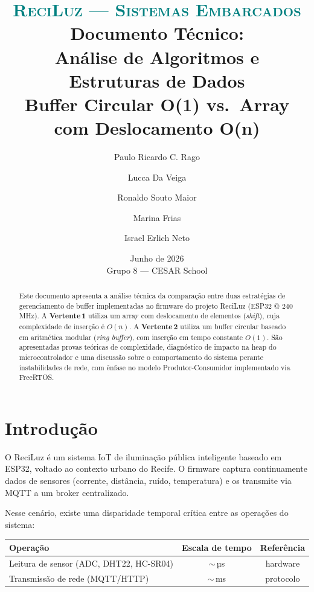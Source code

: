 \documentclass[12pt, a4paper]{article}
\title{
  \vspace{-1cm}
  {\large \textcolor{teal}{\textsc{ReciLuz — Sistemas Embarcados}}}\\[0.4em]
  {\LARGE \textbf{Documento Técnico:\\Análise de Algoritmos e\\Estruturas de Dados}}\\[0.4em]
  {\normalsize Buffer Circular \textcolor{verde}{O(1)} vs.\ Array com Deslocamento \textcolor{vermelho}{O(n)}}
}
\author{
  Paulo Ricardo C. Rago \and
  Lucca Da Veiga \and
  Ronaldo Souto Maior \and
  Marina Frias \and
  Israel Erlich Neto
}
\date{Junho de 2026\\[0.4em]\small Grupo 8 — CESAR School}
\theoremstyle{definition}
\theoremstyle{remark}
\begin{document}

\maketitle
\thispagestyle{fancy}

\begin{abstract}
Este documento apresenta a análise técnica da comparação entre duas estratégias
de gerenciamento de buffer implementadas no firmware do projeto ReciLuz
(ESP32 @ 240\,MHz).
A \textbf{Vertente\,1} utiliza um array com deslocamento de elementos
(\emph{shift}), cuja complexidade de inserção é $O(n)$.
A \textbf{Vertente\,2} utiliza um buffer circular baseado em aritmética modular
(\emph{ring buffer}), com inserção em tempo constante $O(1)$.
São apresentadas provas teóricas de complexidade, diagnóstico de impacto na
heap do microcontrolador e uma discussão sobre o comportamento do sistema
perante instabilidades de rede, com ênfase no modelo Produtor-Consumidor
implementado via FreeRTOS.
\end{abstract}

\tableofcontents
\newpage

\section{Introdução}

O ReciLuz é um sistema IoT de iluminação pública inteligente baseado em ESP32,
voltado ao contexto urbano do Recife. O firmware captura continuamente dados de
sensores (corrente, distância, ruído, temperatura) e os transmite via MQTT a
um broker centralizado.

Nesse cenário, existe uma disparidade temporal crítica entre as operações do
sistema:

\begin{center}
\begin{tabular}{lcc}
  \toprule
  Operação & Escala de tempo & Referência \\
  \midrule
  Leitura de sensor (ADC, DHT22, HC-SR04) & $\sim$\,µs & hardware \\
  Transmissão de rede (MQTT/HTTP) & $\sim$\,ms & protocolo \\
  \bottomrule
\end{tabular}
\end{center}
\end{document}
